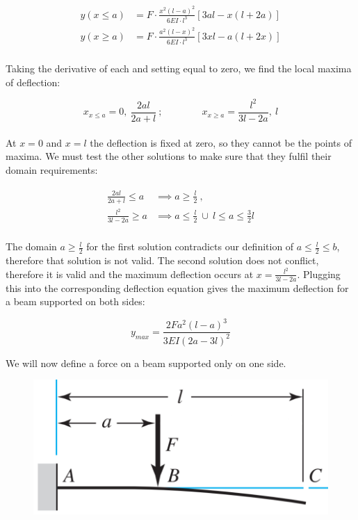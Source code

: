 \documentclass[a4paper]{article}
\begin{document}
	\begin{gather}
	\begin{aligned}
		y\left( x \leq a \right) &= F \cdot \frac{x^2 \left( l - a \right)^2}{6 EI \cdot l^3} \left[ 3a l - x \left( l + 2a \right) \right] \\
		y\left( x \geq a \right) &= F \cdot \frac{a^2 \left( l - x \right)^2}{6 EI \cdot l^3} \left[ 3x l - a \left( l + 2x \right) \right]
	\end{aligned}
	\end{gather}
	\\
	Taking the derivative of each and setting equal to zero, we find the local maxima of deflection:
	
	\begin{equation}
		x_{x \leq a} = 0,\ \frac{2al}{2a+l}\ ; \qquad\qquad
		x_{x \geq a} = \frac{l^2}{3l-2a},\ l
	\end{equation}
	\\
	At $ x = 0 $ and $ x = l $ the deflection is fixed at zero, so they cannot be the points of maxima. We must test the other solutions to make sure that they fulfil their domain requirements:
	
	\begin{gather}
	\begin{aligned}
		\frac{2al}{2a+l} \leq a &\implies a \geq \frac{l}{2}\ , \\
		\frac{l^2}{3l-2a} \geq a &\implies a \leq \frac{l}{2}\ \cup\ l \leq a \leq \frac{3}{2} l
	\end{aligned}
	\end{gather}
	\\
	The domain $ a \geq \frac{l}{2} $ for the first solution contradicts our definition of $ a \leq \frac{l}{2} \leq b $, therefore that solution is not valid. The second solution does not conflict, therefore it is valid and the maximum deflection occurs at $ x = \frac{l^2}{3l-2a} $. Plugging this into the corresponding deflection equation gives the maximum deflection for a beam supported on both sides:
	
	\begin{equation}
		y_{max} = \frac{2F a^2 \left( l - a \right)^3}{3 EI \left( 2a-3l \right)^2}
	\end{equation}
	
	\newpage
	We will now define a force on a beam supported only on one side. 
	
	\begin{figure}[H]
		\centering
		\includegraphics[width=0.7\linewidth]{beam_bend_cantilever}
	\end{figure}
\end{document}
